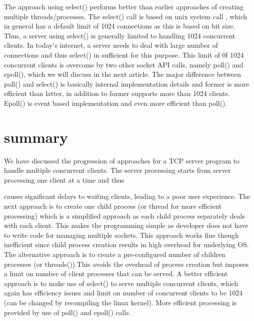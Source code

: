 \begin{multicols}{2}
The approach using select() performs better than earlier approaches of creating multiple threads/processes. The select() call is based on unix system call \cite{art1-key14}, which in general has a default limit of 1024 connections as this is based on bit size. Thus, a server using select() is generally limited to handling 1024 concurrent clients. In today’s internet, a server needs to deal with large number of connections and thus select() in sufficient for this purpose. This limit of 0f 1024 concurrent clients is overcome by two other socket API calls, namely poll() and epoll(), which we will discuss in the next article. The major difference between poll() and select() is basically internal implementation details and former is more efficient than latter, in addition to former supports more than 1024 clients. Epoll() is event based implementation and even more efficient than poll().

\section{summary}

We have discussed the progression of approaches for a TCP server program to handle multiple concurrent clients. The server processing starts from server processing one client at a time and thus 

causes significant delays to waiting clients, leading to a poor user experience. The next approach is to create one child process (or thread for more efficient processing) which is a simplified approach as each child process separately deals with each client. This makes the programming simple as developer does not have to write code for managing multiple sockets. This approach works fine though inefficient since child process creation results in high overhead for underlying OS. The alternative approach is to create a pre-configured number of children processes (or threads()).This avoids the overhead of process creation but imposes a limit on number of client processes that can be served. A better efficient approach is to make use of select() to serve multiple concurrent clients, which again has efficiency issues and limit on number of concurrent clients to be 1024 (can be changed by recompiling the linux kernel). More efficient processing is provided by use of poll() and epoll() calls.


\end{multicols}
